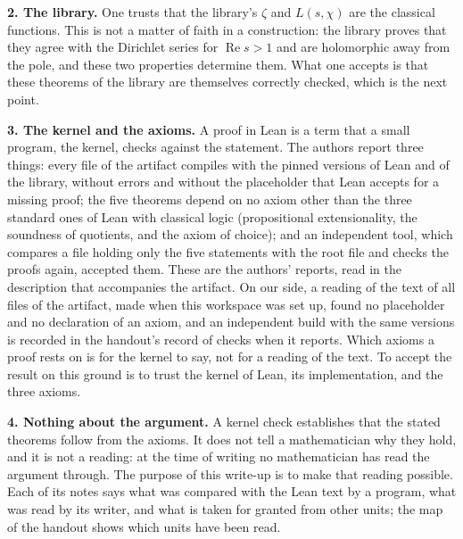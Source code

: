 \documentclass[11pt,a4paper]{article}
\newcommand{\m}[1]{\mbox{$#1$}}        %
\newcommand{\subhead}[1]{\par\addvspace{9pt plus 2pt}\Needspace{4\baselineskip}\noindent\textbf{#1}\enspace\ignorespaces}
\theoremstyle{plainx}
\theoremstyle{uprightx}
\newcommand{\re}{\operatorname{Re}}
\begin{document}
\subhead{2. The library.} One trusts that the library's $\zeta$ and $L(s,\chi)$ are the classical functions.
This is not a matter of faith in a construction: the library proves that they agree with the Dirichlet series for
\m{\re s>1} and are holomorphic away from the pole, and these two properties determine them. What one accepts is
that these theorems of the library are themselves correctly checked, which is the next point.

\subhead{3. The kernel and the axioms.} A proof in Lean is a term that a small program, the kernel, checks
against the statement. The authors report three things: every file of the artifact compiles with the pinned
versions of Lean and of the library, without errors and without the placeholder that Lean accepts for a missing
proof; the five theorems depend on no axiom other than the three standard ones of Lean with classical logic
(propositional extensionality, the soundness of quotients, and the axiom of choice); and an independent tool,
which compares a file holding only the five statements with the root file and checks the proofs again, accepted
them. These are the authors' reports, read in the description that accompanies the artifact. On our side, a
reading of the text of all files of the artifact, made when this workspace was set up, found no placeholder and
no declaration of an axiom, and an independent build with the same versions is recorded in the handout's record of
checks when it reports. Which axioms a proof rests on is for the kernel to say, not for a reading of the text.
To accept the result on this ground is to trust the kernel of Lean, its implementation, and the three axioms.

\subhead{4. Nothing about the argument.} A kernel check establishes that the stated theorems follow from the
axioms. It does not tell a mathematician why they hold, and it is not a reading: at the time of writing no
mathematician has read the argument through. The purpose of this write-up is to make that reading possible. Each of its notes says
what was compared with the Lean text by a program, what was read by its writer, and what is taken for granted from
other units; the map of the handout shows which units have been read.
\end{document}

